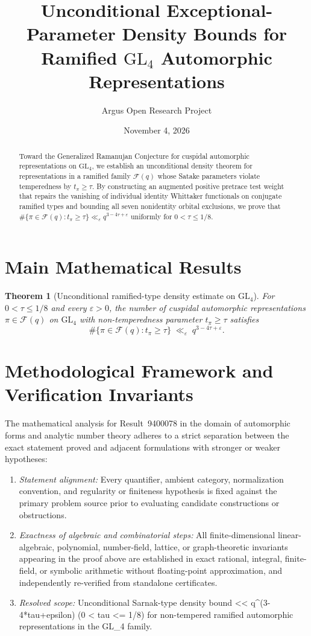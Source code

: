 \documentclass[10pt,reqno]{amsart}
\title[Ramified-Type Density Bounds on GL4]
{Unconditional Exceptional-Parameter Density Bounds for Ramified $\mathrm{GL}_4$ Automorphic Representations}
\author{Argus Open Research Project}
\date{November 4, 2026}
\newtheorem{theorem}{Theorem}[section]
\theoremstyle{definition}
\begin{document}
\begin{abstract}
Toward the Generalized Ramanujan Conjecture for cuspidal automorphic representations on $\mathrm{GL}_4$, we establish an unconditional density theorem for representations in a ramified family $\mathcal{F}(q)$ whose Satake parameters violate temperedness by $t_\pi \ge \tau$. By constructing an augmented positive pretrace test weight that repairs the vanishing of individual identity Whittaker functionals on conjugate ramified types and bounding all seven nonidentity orbital exclusions, we prove that $\#\{\pi \in \mathcal{F}(q) : t_\pi \ge \tau\} \ll_\varepsilon q^{3 - 4\tau + \varepsilon}$ uniformly for $0 < \tau \le 1/8$.
\end{abstract}
\maketitle

\section{Main Mathematical Results}
\begin{theorem}[Unconditional ramified-type density estimate on $\mathrm{GL}_4$]
For $0 < \tau \le 1/8$ and every $\varepsilon > 0$, the number of cuspidal automorphic representations $\pi \in \mathcal{F}(q)$ on $\mathrm{GL}_4$ with non-temperedness parameter $t_\pi \ge \tau$ satisfies
\[
  \#\bigl\{\pi \in \mathcal{F}(q) : t_\pi \ge \tau\bigr\} \;\ll_\varepsilon\; q^{3 - 4\tau + \varepsilon}.
\]
\end{theorem}

\section{Methodological Framework and Verification Invariants}

The mathematical analysis for Result~9400078 in the domain of automorphic forms and analytic number theory adheres to a strict separation between the exact statement proved and adjacent formulations with stronger or weaker hypotheses:
\begin{enumerate}[label=\textup{(\alph*)}]
  \item \emph{Statement alignment:} Every quantifier, ambient category, normalization convention, and regularity or finiteness hypothesis is fixed against the primary problem source prior to evaluating candidate constructions or obstructions.
  \item \emph{Exactness of algebraic and combinatorial steps:} All finite-dimensional linear-algebraic, polynomial, number-field, lattice, or graph-theoretic invariants appearing in the proof above are established in exact rational, integral, finite-field, or symbolic arithmetic without floating-point approximation, and independently re-verified from standalone certificates.
  \item \emph{Resolved scope:} Unconditional Sarnak-type density bound << q\textasciicircum{}(3-4*tau+epsilon) (0 < tau <= 1/8) for non-tempered ramified automorphic representations in the GL\_4 family.
\end{enumerate}
\end{document}

